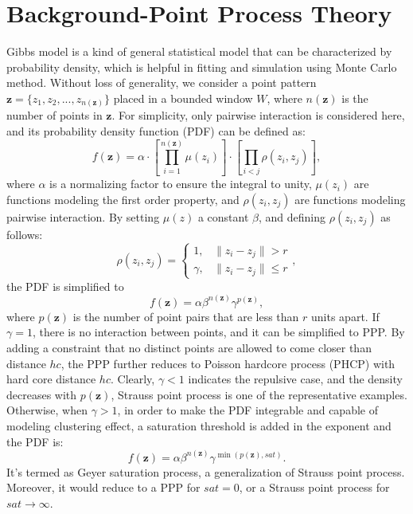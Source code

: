 \documentclass[conference]{IEEEtran}
\begin{document}
\section{Background-Point Process Theory}
Gibbs model\cite{chiu2013stochastic} is a kind of general statistical model that can be characterized by probability density, which is helpful in fitting and simulation using Monte Carlo method. Without loss of generality, we consider a point pattern $\mathbf{z} =\lbrace z_1,z_2,...,z_{n(\mathbf{z})}\rbrace $ placed in a bounded window $W$, where $n(\mathbf{z})$ is the number of points in $\mathbf{z}$. For simplicity, only pairwise interaction is considered here, and its probability density function (PDF) can be defined as:
\begin{equation}
       f(\mathbf{z})= \alpha\cdot[\prod_{i=1}^{n(\mathbf{z})}\mu(z_i)]\cdot[\prod_{i<j}\rho(z_i,z_j)],
\end{equation}
where $\alpha$ is a normalizing factor to ensure the integral to unity, $\mu(z_i)$ are functions modeling the first order property, and $\rho(z_i,z_j)$ are functions modeling pairwise interaction. By setting $\mu(z)$ a constant $\beta$, and defining $\rho(z_i,z_j)$ as follows:
\begin{equation}
\rho(z_i,z_j)=\left\{
\begin{array}{ll}
1, & \parallel z_i-z_j \parallel > r\\
\gamma, & \parallel z_i-z_j\parallel \leq r
\end{array} \right.,
\end{equation}
the PDF is simplified to
\begin{equation}
f(\mathbf{z})=\alpha\beta^{n(\mathbf{z})}\gamma^{p(\mathbf{z})},
\end{equation}
where $p(\mathbf{z})$ is the number of point pairs that are less than $r$ units apart. If $\gamma=1$, there is no interaction between points, and it can be simplified to PPP. By adding a constraint that no distinct points are allowed to come closer than distance $hc$, the PPP further reduces to Poisson hardcore process (PHCP) with hard core distance $hc$. Clearly, $\gamma<1$ indicates the repulsive case, and the density decreases with $p(\mathbf{z})$, Strauss point process is one of the representative examples. Otherwise, when $\gamma>1$, in order to make the PDF integrable and capable of modeling clustering effect, a saturation threshold is added in the exponent and the PDF is:
\begin{equation}
f(\mathbf{z})=\alpha\beta^{n(\mathbf{z})}\gamma^{\min(p(\mathbf{z}),sat)}.
\end{equation}
It's termed as Geyer saturation process, a generalization of Strauss point process. Moreover, it would reduce to a PPP for $sat=0$, or a Strauss point process for $sat\to\infty$.
\end{document}
